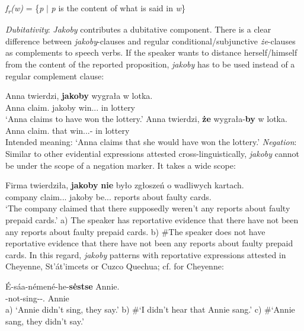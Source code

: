 \documentclass[output=paper
,modfonts
,nonflat]{langsci/langscibook}
\begin{document}
\ea  \emph{f\textsubscript{r}(w)} = \{\emph{p} $ \mid $ \emph{p} is the content of what is said in \emph{w}\} \z
 
 \emph{Dubitativity}: \emph{Jakoby} contributes a dubitative component. There is a clear difference between \emph{jakoby}-clauses and regular conditional\slash subjunctive \emph{że}-clauses as complements to speech verbs. If the speaker wants to distance herself\slash himself from the content of the reported proposition, \emph{jakoby} has to be used instead of a regular complement clause: 

\ea \ea \gll	Anna twierdzi, \textbf{jakoby} wygrała w lotka. \\
		Anna claim.{\thirdperson}{\sg} jakoby win.{\lptcp}.{\sg}.{\fem} in lottery \\
	\glt	`Anna claims to have won the lottery.'
	\ex\gll	*Anna twierdzi, \textbf{że} wygrała-\textbf{by} w lotka. \\  
            Anna claim.{\thirdperson}{\sg} that win.{\lptcp}.{\sg}.{\fem}-{\subj} in lottery \\
	\glt	Intended meaning: `Anna claims that she would have won the lottery.' 
\z\z		
\emph{Negation}: Similar to other evidential expressions attested cross-linguistically, \emph{jakoby} cannot be under the scope of a negation marker. It takes a wide scope: 

\ea \gll Firma twierdziła, \textbf{jakoby} \textbf{nie} było zgłoszeń o wadliwych kartach. \\
		company claim.{\lptcp}.{\sg}.{\fem} jakoby {\negation} be.{\lptcp}.{\sg}.{\n} reports about faulty cards.{\loc} \\
		`The company claimed that there supposedly weren't any reports about faulty prepaid cards.' \newline
\glt	a) The speaker has reportative evidence that there have not been any reports about faulty prepaid cards. \newline
\glt	b) \#The speaker does not have reportative evidence that there have not been any reports about faulty prepaid cards.
\z
In this regard, \emph{jakoby} patterns with reportative expressions attested in Cheyenne, St'át'imcets or Cuzco Quechua; cf.  for Cheyenne:

\ea \gll	 	É-sáa-némené-he-\textbf{sėstse} Annie. \label{cheyenne} \\
		{\thirdperson}-not-sing-{\negation}\textsubscript{{\an}}-{\rep}.{\thirdperson}{\sg}  Annie \\
	\glt	a) `Annie didn't sing, they say.' \newline
	\glt	b)  \#`I didn't hear that Annie sang.' \newline
	\glt	c)  \#`Annie sang, they didn't say.' 
\z		
\end{document}
